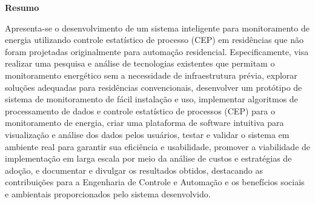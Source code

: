 
\begin{center}
\huge{{\bf Resumo}}
\vspace{2cm}
\end{center}


Apresenta-se o desenvolvimento de um sistema inteligente para monitoramento de energia
utilizando controle estatístico de processo (CEP) em residências que não foram projetadas originalmente para automação residencial.
Especificamente, visa realizar uma pesquisa e análise de tecnologias existentes que permitam o
monitoramento energético sem a necessidade de infraestrutura prévia, explorar soluções adequadas para
residências convencionais, desenvolver um protótipo de sistema de monitoramento de fácil instalação e
uso, implementar algoritmos de processamento de dados e controle estatístico de processos (CEP) para o monitoramento de energia, criar uma plataforma de software intuitiva para visualização e análise dos dados pelos
usuários, testar e validar o sistema em ambiente real para garantir sua eficiência e usabilidade, promover a
viabilidade de implementação em larga escala por meio da análise de custos e estratégias de adoção, e
documentar e divulgar os resultados obtidos, destacando as contribuições para a Engenharia de Controle e
Automação e os benefícios sociais e ambientais proporcionados pelo sistema desenvolvido.


\clearpage
\thispagestyle{empty}
\cleardoublepage
